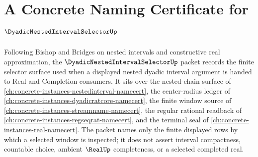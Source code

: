 \chapter{A Concrete Naming Certificate for $\DyadicNestedIntervalSelectorUp$}
\label{ch:concrete-instances-dyadic-nested-interval-selector-namecert}

Following Bishop and Bridges on nested intervals and constructive real approximation, the $\DyadicNestedIntervalSelectorUp$ packet records the finite selector surface used when a displayed nested dyadic interval argument is handed to Real and Completion consumers. It sits over the nested-chain surface of \autoref{ch:concrete-instances-nestedinterval-namecert}, the center-radius ledger of \autoref{ch:concrete-instances-dyadicratcore-namecert}, the finite window source of \autoref{ch:concrete-instances-streamname-namecert}, the regular rational readback of \autoref{ch:concrete-instances-regseqrat-namecert}, and the terminal seal of \autoref{ch:concrete-instances-real-namecert}. The packet names only the finite displayed rows by which a selected window is inspected; it does not assert interval compactness, countable choice, ambient $\RealUp$ completeness, or a selected completed real.

